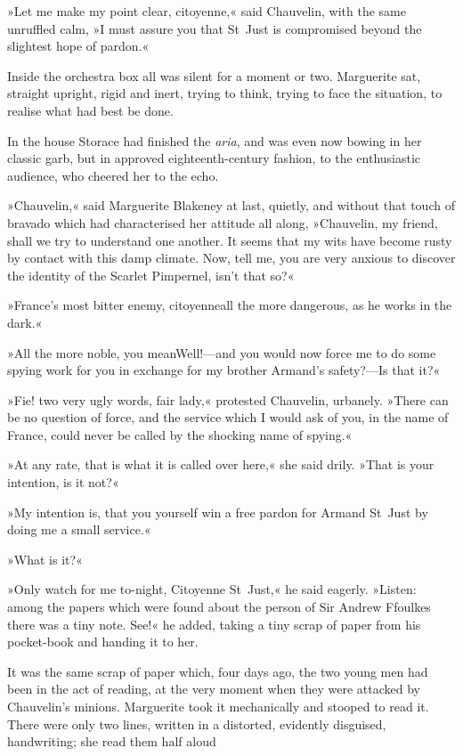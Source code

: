 »Let me make my point clear, citoyenne,« said Chauvelin, with the same unruffled calm, »I must assure you that St~Just is compromised beyond the slightest hope of pardon.«

Inside the orchestra box all was silent for a moment or two. Marguerite sat, straight upright, rigid and inert, trying to think, trying to face the situation, to realise what had best be done.

In the house Storace had finished the \textit{aria}, and was even now bowing in her classic garb, but in approved eighteenth-century fashion, to the enthusiastic audience, who cheered her to the echo.

»Chauvelin,« said Marguerite Blakeney at last, quietly, and with\-out that touch of bravado which had characterised her attitude all along, »Chauvelin, my friend, shall we try to understand one another. It seems that my wits have become rusty by contact with this damp climate. Now, tell me, you are very anxious to discover the identity of the Scarlet Pimpernel, isn't that so?«

»France's most bitter enemy, citoyenne\textellipsis \allowbreak  all the more dangerous, as he works in the dark.«

»All the more noble, you mean\textellipsis \allowbreak  Well!—and you would now force me to do some spying work for you in exchange for my brother Armand's safety?—Is that it?«

»Fie! two very ugly words, fair lady,« protested Chauvelin, ur\-bane\-ly. »There can be no question of force, and the service which I would ask of you, in the name of France, could never be called by the shocking name of spying.«

»At any rate, that is what it is called over here,« she said drily. »That is your intention, is it not?«

»My intention is, that you yourself win a free pardon for Armand St~Just by doing me a small service.«

»What is it?«

»Only watch for me to-night, Citoyenne St~Just,« he said eagerly. »Listen: among the papers which were found about the person of Sir Andrew Ffoulkes there was a tiny note. See!« he added, taking a tiny scrap of paper from his pocket-book and handing it to her.

It was the same scrap of paper which, four days ago, the two young men had been in the act of reading, at the very moment when they were attacked by Chauvelin's minions. Marguerite took it mechanically and stooped to read it. There were only two lines, written in a distorted, evidently disguised, handwriting; she read them half aloud\longdash


